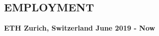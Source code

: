 \documentclass[margin]{res}
\begin{document}
\begin{resume}
%	
% 
% 

\section{EMPLOYMENT}
\textbf{ETH Zurich, Switzerland \hfill{June 2019 - Now}\\}



\end{resume}
\end{document}
